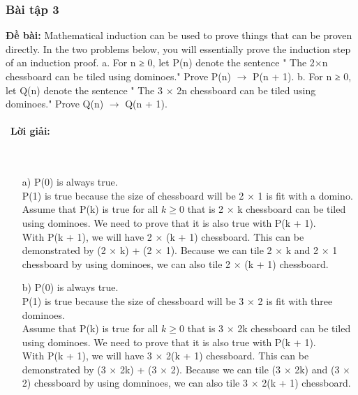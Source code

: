 \documentclass[a4paper]{article}
\begin{document}
\begin{enumerate}
\subsubsection{Bài tập 3}
\textbf{Đề bài:} Mathematical induction can be used to prove things that can be proven directly. In the two problems below, you will essentially prove the induction step of an induction proof.
a. For n ≥ 0, let P(n) denote the sentence " The 2×n chessboard can be tiled using dominoes." Prove P(n) $\rightarrow$ P(n + 1).
b. For n ≥ 0, let Q(n) denote the sentence " The 3 × 2n chessboard can be tiled using dominoes." Prove Q(n) $\rightarrow$ Q(n + 1).
\\\ \\\
\textbf{Lời giải:} \\\ \\\
\begin{enumerate}
	\item[a)] P(0) is always true.\\
	P(1) is true because the size of chessboard will be 2 $\times$ 1 is fit with a domino.
	Assume that P(k) is true for all $k \ge 0$ that is 2 $\times$ k chessboard can be tiled using dominoes. We need to prove that it is also true with P(k + 1).\\
	With P(k + 1), we will have 2 $\times$ (k + 1) chessboard. This can be demonstrated by (2 $\times$ k) + (2 $\times$ 1). Because we can tile 2 $\times$ k and 2 $\times$ 1 chessboard by using dominoes, we can also tile 2 $\times$ (k + 1) chessboard.\\
	\item[b)] P(0) is always true.\\
	P(1) is true because the size of chessboard will be 3 $\times$ 2 is fit with three dominoes.\\
	Assume that P(k) is true for all $k \ge 0$ that is 3 $\times$ 2k chessboard can be tiled using dominoes. We need to prove that it is also true with P(k + 1).\\
	With P(k + 1), we will have 3 $\times$ 2(k + 1) chessboard. This can be demonstrated by (3 $\times$ 2k) + (3 $\times$ 2). Because we can tile (3 $\times$ 2k) and (3 $\times$ 2) chessboard by using domninoes, we can also tile 3 $\times$ 2(k + 1) chessboard.\\   
\end{enumerate}
\clearpage

\end{enumerate}
\end{document}

